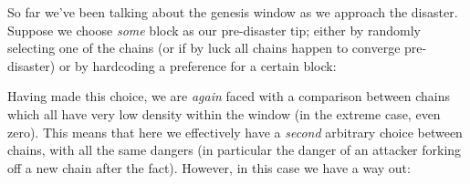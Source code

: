 So far we've been talking about the genesis window as we approach the disaster.
Suppose we choose \emph{some} block as our pre-disaster tip; either by randomly
selecting one of the chains (or if by luck all chains happen to converge
pre-disaster) or by hardcoding a preference for a certain block:
%
\begin{center}
\end{center}
%
Having made this choice,  we are \emph{again} faced with a comparison between
chains which all have very low density within the window (in the extreme case,
even zero). This means that here we effectively have a \emph{second} arbitrary
choice between chains, with all the same dangers (in particular the danger of an
attacker forking off a new chain after the fact). However, in this case we have
a way out:
%
